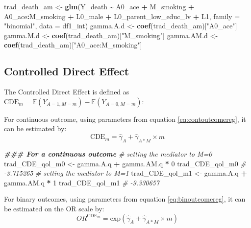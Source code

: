 \documentclass[
]{book}
\newenvironment{Shaded}{\begin{snugshade}}{\end{snugshade}}
\newcommand{\AttributeTok}[1]{\textcolor[rgb]{0.13,0.29,0.53}{#1}}
\newcommand{\CommentTok}[1]{\textcolor[rgb]{0.56,0.35,0.01}{\textit{#1}}}
\newcommand{\DecValTok}[1]{\textcolor[rgb]{0.00,0.00,0.81}{#1}}
\newcommand{\DocumentationTok}[1]{\textcolor[rgb]{0.56,0.35,0.01}{\textbf{\textit{#1}}}}
\newcommand{\FunctionTok}[1]{\textcolor[rgb]{0.13,0.29,0.53}{\textbf{#1}}}
\newcommand{\NormalTok}[1]{#1}
\newcommand{\OtherTok}[1]{\textcolor[rgb]{0.56,0.35,0.01}{#1}}
\newcommand{\SpecialCharTok}[1]{\textcolor[rgb]{0.81,0.36,0.00}{\textbf{#1}}}
\newcommand{\StringTok}[1]{\textcolor[rgb]{0.31,0.60,0.02}{#1}}
\begin{document}
\begin{Shaded}
\begin{Highlighting}[]
\NormalTok{trad\_death\_am }\OtherTok{\textless{}{-}} \FunctionTok{glm}\NormalTok{(Y\_death }\SpecialCharTok{\textasciitilde{}}\NormalTok{ A0\_ace }\SpecialCharTok{+}\NormalTok{ M\_smoking }\SpecialCharTok{+}\NormalTok{ A0\_ace}\SpecialCharTok{:}\NormalTok{M\_smoking }\SpecialCharTok{+}
\NormalTok{                       L0\_male }\SpecialCharTok{+}\NormalTok{ L0\_parent\_low\_educ\_lv }\SpecialCharTok{+}\NormalTok{ L1,}
                     \AttributeTok{family =} \StringTok{"binomial"}\NormalTok{,}
                     \AttributeTok{data =}\NormalTok{ df1\_int)}
\NormalTok{gamma.A.d }\OtherTok{\textless{}{-}} \FunctionTok{coef}\NormalTok{(trad\_death\_am)[}\StringTok{"A0\_ace"}\NormalTok{]}
\NormalTok{gamma.M.d }\OtherTok{\textless{}{-}} \FunctionTok{coef}\NormalTok{(trad\_death\_am)[}\StringTok{"M\_smoking"}\NormalTok{]}
\NormalTok{gamma.AM.d }\OtherTok{\textless{}{-}} \FunctionTok{coef}\NormalTok{(trad\_death\_am)[}\StringTok{"A0\_ace:M\_smoking"}\NormalTok{]}
\end{Highlighting}
\end{Shaded}

\subsection{Controlled Direct Effect}\label{trad2waycde}

The Controlled Direct Effect is defined as \(\text{CDE}_m = \mathbb{E}(Y_{A=1,M=m}) - \mathbb{E}(Y_{A=0,M=m})\):

For continuous outcome, using parameters from equation \eqref{eq:contoutcomereg}, it can be estimated by:
\[\text{CDE}_m = \hat{\gamma}_A + \hat{\gamma}_{A \ast M} \times m\]

\begin{Shaded}
\begin{Highlighting}[]
\DocumentationTok{\#\#\# For a continuous outcome}
\CommentTok{\# setting the mediator to M=0}
\NormalTok{trad\_CDE\_qol\_m0 }\OtherTok{\textless{}{-}}\NormalTok{ gamma.A.q }\SpecialCharTok{+}\NormalTok{ gamma.AM.q }\SpecialCharTok{*} \DecValTok{0}
\NormalTok{trad\_CDE\_qol\_m0}
\CommentTok{\# {-}3.715265}
\CommentTok{\# setting the mediator to M=1}
\NormalTok{trad\_CDE\_qol\_m1 }\OtherTok{\textless{}{-}}\NormalTok{ gamma.A.q }\SpecialCharTok{+}\NormalTok{ gamma.AM.q }\SpecialCharTok{*} \DecValTok{1}
\NormalTok{trad\_CDE\_qol\_m1}
\CommentTok{\# {-}9.330657}
\end{Highlighting}
\end{Shaded}

For binary outcomes, using parameters from equation \eqref{eq:binoutcomereg}, it can be estimated on the OR scale by:
\[OR^{\text{CDE}_m} = \text{exp}\left(\hat{\gamma}_A + \hat{\gamma}_{A \ast M} \times m\right)\]
\end{document}
